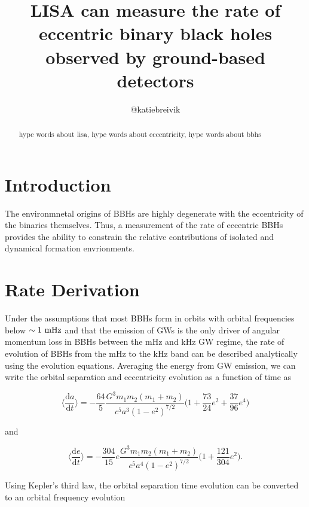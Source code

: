\documentclass[twocolumn]{aastex631}
\begin{document}
\title{LISA can measure the rate of eccentric binary black holes observed by ground-based detectors}

\author{@katiebreivik}

\begin{abstract}
    hype words about lisa, hype words about eccentricity, hype words about bbhs
\end{abstract}

\section{Introduction}
\label{sec:intro}

The environmnetal origins of BBHs are highly degenerate with the eccentricity of the binaries themselves. Thus, a measurement of the rate of eccentric BBHs provides the ability to constrain the relative contributions of isolated and dynamical formation envrionments. 

\section{Rate Derivation}
\label{sec:rates}
Under the assumptions that most BBHs form in orbits with orbital frequencies below $\sim 1~\rm{mHz}$ and that the emission of GWs is the only driver of angular momentum loss in BBHs between the mHz and kHz GW regime, the rate of evolution of BBHs from the mHz to the kHz band can be described analytically using the \citet{Peters1964} evolution equations. Averaging the energy from GW emission, we can write the orbital separation and eccentricity evolution as a function of time as

\begin{equation}
    \Big\langle \frac{\mathrm{d}a}{\mathrm{d}t} \Big\rangle = - \frac{64}{5} \frac{G^3 m_1 m_2 (m_1 + m_2)}{c^5 a^3 (1 - e^2)^{7/2}} \Big(1 + \frac{73}{24} e^2 + \frac{37}{96} e^4 \Big)
    \label{eq:dadt}
\end{equation}

\noindent and 

\begin{equation}
    \Big\langle\frac{\mathrm{d}e}{\mathrm{d}t}\Big\rangle = -\frac{304}{15} e \frac{G^3 m_1 m_2 (m_1 + m_2)}{c^5 a^4 (1-e^2)^{7/2}} \Big( 1 + \frac{121}{304} e^{2}\Big).
    \label{eq:dedt}
\end{equation}

Using Kepler's third law, the orbital separation time evolution can be converted to an orbital frequency evolution 
\end{document}
